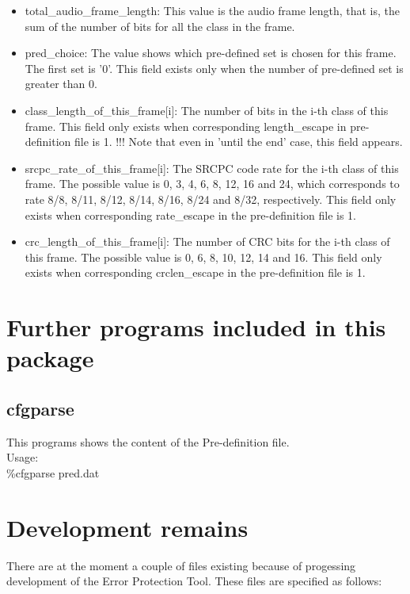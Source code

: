 \documentclass[a4paper]{article}
\begin{document}
\begin{itemize}
\item total\_audio\_frame\_length:
This value is the audio frame length, that is, the sum of the number of
bits for all the class in the frame.

\item pred\_choice:
The value shows which pre-defined set is chosen for this frame. The
first set is '0'. This field exists only when the number of
pre-defined set is greater than 0. 


\item class\_length\_of\_this\_frame[i]:
  The number of bits in the i-th class of this frame. This field only exists when corresponding length\_escape in pre-definition file is 1. 
  !!! Note that even in 'until the end' case, this field appears.

\item srcpc\_rate\_of\_this\_frame[i]:
  The SRCPC code rate for the i-th class of this frame. The possible
  value is 0, 3, 4, 6, 8, 12, 16 and 24, which corresponds to rate
  8/8, 8/11, 8/12, 8/14, 8/16, 8/24 and 8/32, respectively. This field
  only exists when corresponding rate\_escape in the pre-definition
  file is 1.

\item crc\_length\_of\_this\_frame[i]:
  The number of CRC bits for the i-th class of this frame. The
  possible value is 0, 6, 8, 10, 12, 14 and 16. This field only exists
  when corresponding crclen\_escape in the pre-definition file is
  1. 

\end{itemize}
 
\section{Further programs included in this package}
\subsection{cfgparse}
  This programs shows the content of the Pre-definition file.\\
  Usage: \\
  \%cfgparse pred.dat


\section{Development remains}
There are at the moment a couple of files existing because of progessing development of the Error Protection Tool. These files are specified as follows:
\end{document}
